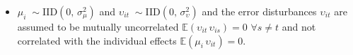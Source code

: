 \documentclass[aspectratio=169]{beamer}\usepackage[]{graphicx}\usepackage[]{color}
\begin{document}
{\begin{itemize}
\item $\mu_{i}\;\sim$IID$(0,\,\sigma^2_{\mu})$ and $\upsilon_{it}\;\sim$IID$(0,\,\sigma^2_{\upsilon})$ and the error disturbances $\upsilon_{it}$ are assumed to be mutually uncorrelated $\mathbb{E}(\upsilon_{it}\, \upsilon_{is})= 0\,\, \forall s \neq t$ and not correlated with the individual effects $\mathbb{E}(\mu_{i}\, \upsilon_{it})= 0$.

\end{itemize}
 
% 




}


\end{document}
